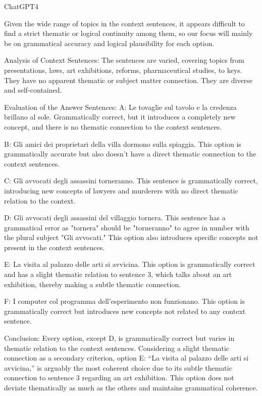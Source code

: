 ChatGPT4

Given the wide range of topics in the context sentences, it appears difficult to find a strict thematic or logical continuity among them, so our focus will mainly be on grammatical accuracy and logical plausibility for each option.

Analysis of Context Sentences:
The sentences are varied, covering topics from presentations, laws, art exhibitions, reforms, pharmaceutical studies, to keys. They have no apparent thematic or subject matter connection. They are diverse and self-contained.

Evaluation of the Answer Sentences:
A: Le tovaglie sul tavolo e la credenza brillano al sole.
Grammatically correct, but it introduces a completely new concept, and there is no thematic connection to the context sentences.

B: Gli amici dei proprietari della villa dormono sulla spiaggia.
This option is grammatically accurate but also doesn’t have a direct thematic connection to the context sentences.

C: Gli avvocati degli assassini torneranno.
This sentence is grammatically correct, introducing new concepts of lawyers and murderers with no direct thematic relation to the context.

D: Gli avvocati degli assassini del villaggio tornera.
This sentence has a grammatical error as "tornera" should be "torneranno" to agree in number with the plural subject "Gli avvocati." This option also introduces specific concepts not present in the context sentences.

E: La visita al palazzo delle arti si avvicina.
This option is grammatically correct and has a slight thematic relation to sentence 3, which talks about an art exhibition, thereby making a subtle thematic connection.

F: I computer col programma dell'esperimento non funzionano.
This option is grammatically correct but introduces new concepts not related to any context sentence.

Conclusion:
Every option, except D, is grammatically correct but varies in thematic relation to the context sentences. Considering a slight thematic connection as a secondary criterion, option E: “La visita al palazzo delle arti si avvicina,” is arguably the most coherent choice due to its subtle thematic connection to sentence 3 regarding an art exhibition. This option does not deviate thematically as much as the others and maintains grammatical coherence.

